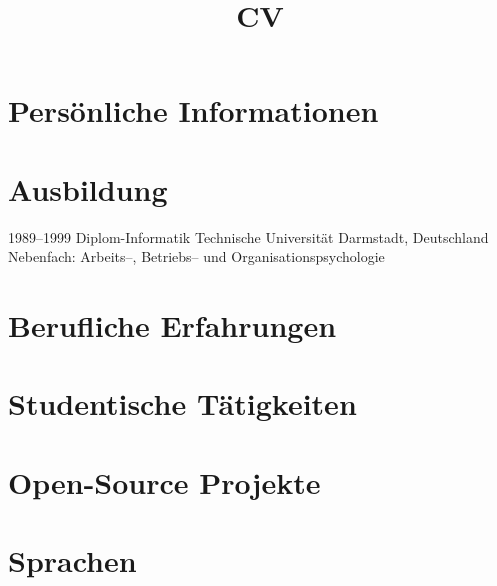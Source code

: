 \documentclass[12pt,a4paper,sans]{moderncv}
\title{CV}
\begin{document}
\makecvtitle

\section{Persönliche Informationen}

\section{Ausbildung}
\cventry
{1989--1999}
{Diplom-Informatik}
{Technische Universität}
{Darmstadt, Deutschland}
{}
{Nebenfach: Arbeits--, Betriebs-- und Organisationspsychologie}

\section{Berufliche Erfahrungen}

















\section{Studentische Tätigkeiten}





\section{Open-Source Projekte}





\section{Sprachen}
\end{document}
